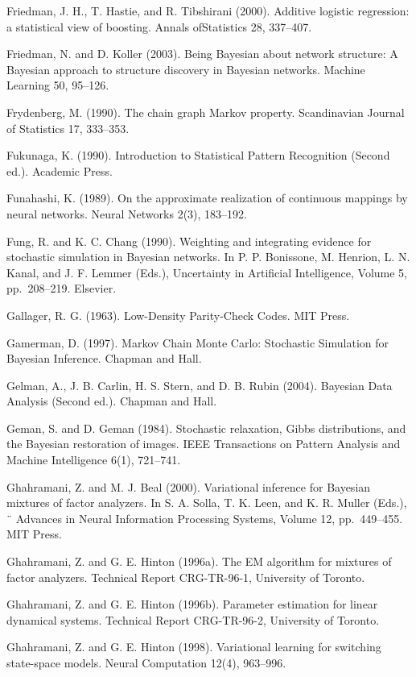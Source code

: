 \documentclass[
  10
]{article}
\begin{document}
Friedman, J. H., T. Hastie, and R. Tibshirani (2000). Additive logistic
regression: a statistical view of boosting. Annals ofStatistics 28,
337--407.

Friedman, N. and D. Koller (2003). Being Bayesian about network
structure: A Bayesian approach to structure discovery in Bayesian
networks. Machine Learning 50, 95--126.

Frydenberg, M. (1990). The chain graph Markov property. Scandinavian
Journal of Statistics 17, 333--353.

Fukunaga, K. (1990). Introduction to Statistical Pattern Recognition
(Second ed.). Academic Press.

Funahashi, K. (1989). On the approximate realization of continuous
mappings by neural networks. Neural Networks 2(3), 183--192.

Fung, R. and K. C. Chang (1990). Weighting and integrating evidence for
stochastic simulation in Bayesian networks. In P. P. Bonissone, M.
Henrion, L. N. Kanal, and J. F. Lemmer (Eds.), Uncertainty in Artificial
Intelligence, Volume 5, pp.~208--219. Elsevier.

Gallager, R. G. (1963). Low-Density Parity-Check Codes. MIT Press.

Gamerman, D. (1997). Markov Chain Monte Carlo: Stochastic Simulation for
Bayesian Inference. Chapman and Hall.

Gelman, A., J. B. Carlin, H. S. Stern, and D. B. Rubin (2004). Bayesian
Data Analysis (Second ed.). Chapman and Hall.

Geman, S. and D. Geman (1984). Stochastic relaxation, Gibbs
distributions, and the Bayesian restoration of images. IEEE Transactions
on Pattern Analysis and Machine Intelligence 6(1), 721--741.

Ghahramani, Z. and M. J. Beal (2000). Variational inference for Bayesian
mixtures of factor analyzers. In S. A. Solla, T. K. Leen, and K. R.
Muller (Eds.), ¨ Advances in Neural Information Processing Systems,
Volume 12, pp.~449--455. MIT Press.

Ghahramani, Z. and G. E. Hinton (1996a). The EM algorithm for mixtures
of factor analyzers. Technical Report CRG-TR-96-1, University of
Toronto.

Ghahramani, Z. and G. E. Hinton (1996b). Parameter estimation for linear
dynamical systems. Technical Report CRG-TR-96-2, University of Toronto.

Ghahramani, Z. and G. E. Hinton (1998). Variational learning for
switching state-space models. Neural Computation 12(4), 963--996.
\end{document}
